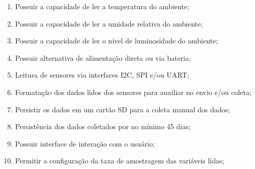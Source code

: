     \begin{enumerate}
        \item Possuir a capacidade de ler a temperatura do ambiente;
        \item Possuir a capacidade de ler a umidade relativa do ambiente;
        \item Possuir a capacidade de ler o nível de luminosidade do ambiente;
        \item Possuir alternativa de alimentação direta ou via bateria;
        \item Leitura de sensores via interfaces \gls{I2C}, \gls{SPI} e/ou \gls{UART};
        \item Formatação dos dados lidos dos sensores para auxiliar no envio e/ou coleta;
        \item Persistir os dados em um cartão SD para a coleta manual dos dados;
        \item Persistência dos dados coletados por no mínimo 45 dias;
        \item Possuir interface de interação com o usuário;
        \item Permitir a configuração da taxa de amostragem das variáveis lidas;

    \end{enumerate}

